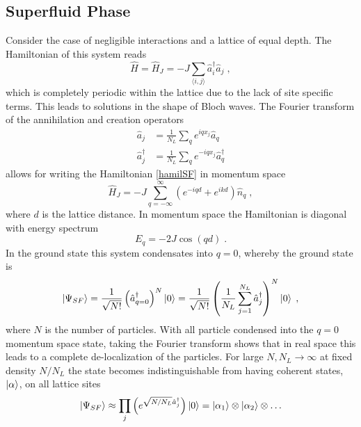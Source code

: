 \subsection{Superfluid Phase}
Consider the case of negligible interactions and a lattice of equal depth. The Hamiltonian of this system reads
\begin{equation}
	\hat{H} = \hat{H}_J = - J \sum_{\langle i,j \rangle} \hat{a}_{i}^{\dag} \hat{a}_{j} \; , 
	\label{hamilSF}
\end{equation}
which is completely periodic within the lattice due to the lack of site specific terms. This leads to solutions in the shape of Bloch waves. The Fourier transform of the annihilation and creation operators
\begin{align}
	\hat{a}_j &= \frac{1}{N_L} \sum_{q}  e^{i q x_j} \hat{a}_q \\
	\hat{a}_{j}^{\dag} &= \frac{1}{N_L} \sum_{q}  e^{-i q x_j} \hat{a}_{q}^{\dag}
\end{align}
allows for writing the Hamiltonian \ref{hamilSF} in momentum space
\begin{equation}
	\hat{H}_J = - J \sum_{q = - \infty}^{\infty} \left( e^{- i q d } + e^{i k d} \right) \hat{n}_q \; ,
\end{equation}
where $d$ is the lattice distance. In momentum space the Hamiltonian is diagonal with energy spectrum
\begin{equation}
	E_q = -2 J \cos(q d) \; .
	\label{SFenergy}
\end{equation}
In the ground state this system condensates into $q = 0$, whereby the ground state is
\begin{equation}
	\ket{\Psi_{SF}} =  \frac{1}{\sqrt{N!}} \left( \hat{a}_{q = 0}^{\dag} \right) ^N \ket{0} = \frac{1}{\sqrt{N!}} \left( \frac{1}{N_L} \sum_{j = 1}^{N_L} \hat{a}_{j}^{\dag} \right) ^N \ket{0} \; ,
\end{equation} 
where $N$ is the number of particles. With all particle condensed into the $q = 0$ momentum space state, taking the Fourier transform shows that in real space this leads to a complete de-localization of the particles. For large $N,N_L \rightarrow \infty$ at fixed density $N/N_L$ the state becomes indistinguishable from having coherent states, $\ket{\alpha} $, on all lattice sites \cite{manybodyBloch}
\begin{equation}
	\ket{\Psi_{SF}} \approx \prod_j \left( e^{\sqrt{N/N_L} \hat{a}_{j}^{\dag}} \right) \ket{0} = \ket{\alpha_1} \otimes \ket{\alpha_2} \otimes \ldots
	\label{stateSF}
\end{equation}

